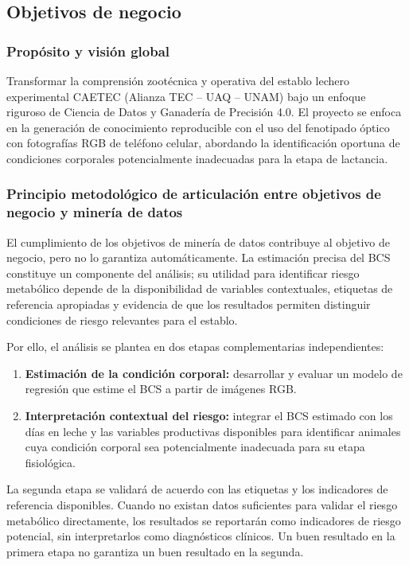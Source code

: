 \subsection{Objetivos de negocio}

\subsubsection{Propósito y visión global}

Transformar la comprensión zootécnica y operativa del establo lechero experimental CAETEC (Alianza TEC -- UAQ -- UNAM) bajo un enfoque riguroso de Ciencia de Datos y Ganadería de Precisión 4.0. El proyecto se enfoca en la generación de conocimiento reproducible con el uso del fenotipado óptico con fotografías RGB de teléfono celular, abordando la identificación oportuna de condiciones corporales potencialmente inadecuadas para la etapa de lactancia.

\subsubsection{Principio metodológico de articulación entre objetivos de negocio y minería de datos}

El cumplimiento de los objetivos de minería de datos contribuye al objetivo de negocio, pero no lo garantiza automáticamente. La estimación precisa del BCS constituye un componente del análisis; su utilidad para identificar riesgo metabólico depende de la disponibilidad de variables contextuales, etiquetas de referencia apropiadas y evidencia de que los resultados permiten distinguir condiciones de riesgo relevantes para el establo.

Por ello, el análisis se plantea en dos etapas complementarias independientes:

\begin{enumerate}
  \item \textbf{Estimación de la condición corporal:} desarrollar y evaluar un modelo de regresión que estime el BCS a partir de imágenes RGB.
  \item \textbf{Interpretación contextual del riesgo:} integrar el BCS estimado con los días en leche y las variables productivas disponibles para identificar animales cuya condición corporal sea potencialmente inadecuada para su etapa fisiológica.
\end{enumerate}

La segunda etapa se validará de acuerdo con las etiquetas y los indicadores de referencia disponibles. Cuando no existan datos suficientes para validar el riesgo metabólico directamente, los resultados se reportarán como indicadores de riesgo potencial, sin interpretarlos como diagnósticos clínicos. Un buen resultado en la primera etapa no garantiza un buen resultado en la segunda.

